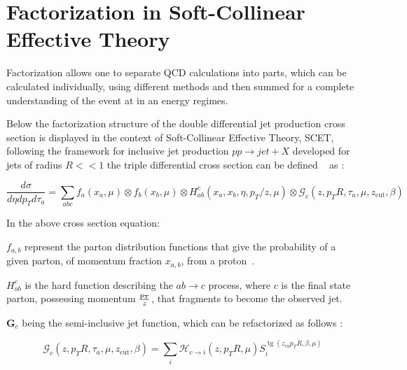 

\section{Factorization in Soft-Collinear Effective Theory}\label{sec:SCET}

Factorization allows one to separate QCD calculations into parts, which can be calculated individually, using different methods and then summed for a complete understanding of the event at in an energy regimes.


Below the factorization structure of the double differential jet production cross section is displayed in the context of Soft-Collinear Effective Theory, SCET, following the framework for inclusive jet production $pp \rightarrow jet + X$ developed for jets of radius $R <<1$ the triple differential cross section can be defined ~\cite{Kang:2018vgn} as :



\begin{equation}
\frac{d \sigma}{d \eta d p_{T} d \tau_{a}}=\sum_{a b c} f_{a}\left(x_{a}, \mu\right) \otimes f_{b}\left(x_{b}, \mu\right) \otimes H_{a b}^{c}\left(x_{a}, x_{b}, \eta, p_{T} / z, \mu\right) \otimes \mathcal{G}_{c}\left(z, p_{T} R, \tau_{a}, \mu, z_{\mathrm{cut}}, \beta\right)
\end{equation}


In the above cross section equation: \newline

$f_{a, b}$ represent the parton distribution functions that give the probability of a given parton, of momentum fraction $x_{a,b}$, from a proton~\cite{Kang:2018vgn}.\newline

$H_{a b}^{c}$ is the hard function describing the $a b \rightarrow c$ process, where $c$ is the final state parton, possessing momentum $\frac{p_{\mathrm{T}}}{z}$, that fragments to become the observed jet. 


 $\boldsymbol{G}_{c}$ being the semi-inclusive jet function, which can be refactorized as follows :


\begin{equation}
\mathcal{G}_{c}\left(z, p_{T} R, \tau_{a}, \mu, z_{\mathrm{cut}}, \beta\right)=\sum_{i} \mathcal{H}_{c \rightarrow i}\left(z, p_{T} R, \mu\right) S_{i}^{\operatorname{tg}\left(z_{\mathrm{cu}} p_{T} R, \beta, \mu\right)}
\end{equation}


